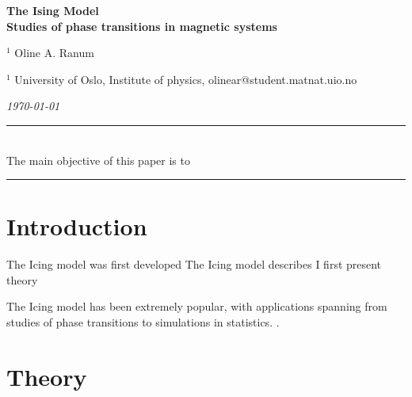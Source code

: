 \documentclass[%
reprint,nofootinbib,
amsmath,amssymb,
aps,
]{revtex4-1}
\newcommand{\HRule}{\rule{\textwidth}{0.5mm}}
\begin{document}
\onecolumngrid

\begin{center}
	\large\textbf{The Ising Model\\ \small{Studies of phase transitions in magnetic systems}}
\end{center}
\vspace{5mm}

\begin{center}
	\small{$^1$ Oline A. Ranum}\\
\end{center}

\begin{center}
	\small{$^1$ University of Oslo, Institute of physics, 
		olinear@student.matnat.uio.no}
\end{center}

\begin{center}
	\textit{\today}
\end{center}
\vspace{7mm}
\noindent 
\HRule \vspace{2mm}\\
The main objective of this paper is to 
\vspace{1.5mm}  \\
\HRule
\vspace{0.3cm}

\twocolumngrid 
\section{Introduction}
The Icing model was first developed
The Icing model describes
I first present theory 

The Icing model has been extremely popular, with applications spanning from studies of phase transitions to simulations in statistics. 
 \newpage. \newpage 
\section{Theory} \noindent 
\end{document}

